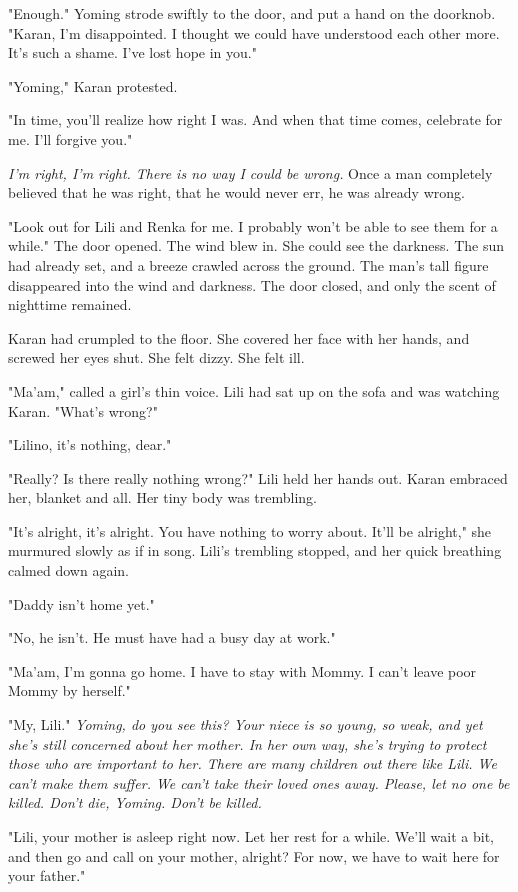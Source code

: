 "Enough." Yoming strode swiftly to the door, and put a hand on the
doorknob. "Karan, I'm disappointed. I thought we could have understood
each other more. It's such a shame. I've lost hope in you."

"Yoming," Karan protested.

"In time, you'll realize how right I was. And when that time comes,
celebrate for me. I'll forgive you."

\emph{I'm right, I'm right. There is no way I could be wrong.} Once a man
completely believed that he was right, that he would never err, he was
already wrong.

"Look out for Lili and Renka for me. I probably won't be able to see
them for a while." The door opened. The wind blew in. She could see the
darkness. The sun had already set, and a breeze crawled across the
ground. The man's tall figure disappeared into the wind and darkness.
The door closed, and only the scent of nighttime remained.

Karan had crumpled to the floor. She covered her face with her hands,
and screwed her eyes shut. She felt dizzy. She felt ill.

"Ma'am," called a girl's thin voice. Lili had sat up on the sofa and was
watching Karan. "What's wrong?"

"Lili\el no, it's nothing, dear."

"Really? Is there really nothing wrong?" Lili held her hands out. Karan
embraced her, blanket and all. Her tiny body was trembling.

"It's alright, it's alright. You have nothing to worry about. It'll be
alright," she murmured slowly as if in song. Lili's trembling stopped,
and her quick breathing calmed down again.

"Daddy isn't home yet."

"No, he isn't. He must have had a busy day at work."

"Ma'am, I'm gonna go home. I have to stay with Mommy. I can't leave poor
Mommy by herself."

"My, Lili." \emph{Yoming, do you see this? Your niece is so young, so weak,
and yet she's still concerned about her mother. In her own way, she's
trying to protect those who are important to her. There are many
children out there like Lili. We can't make them suffer. We can't take
their loved ones away. Please, let no one be killed. Don't die, Yoming.
Don't be killed.}

"Lili, your mother is asleep right now. Let her rest for a while. We'll
wait a bit, and then go and call on your mother, alright? For now, we
have to wait here for your father."

